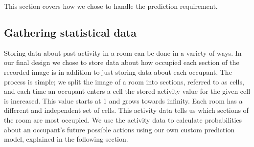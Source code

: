 This section covers how we chose to handle the prediction requirement. 

\subsection{Gathering statistical data}
\label{ssub:statisticaldata}
Storing data about past activity in a room can be done in a variety of ways. In our final design we chose to store data about how occupied each section of the recorded image is in addition to just storing data about each occupant. The process is simple; we split the image of a room into sections, referred to as cells, and each time an occupant enters a cell the stored activity value for the given cell is increased. This value starts at 1 and grows towards infinity. Each room has a different and independent set of cells. This activity data tells us which sections of the room are most occupied. We use the activity data to calculate probabilities about an occupant's future possible actions using our own custom prediction model, explained in the following section.

